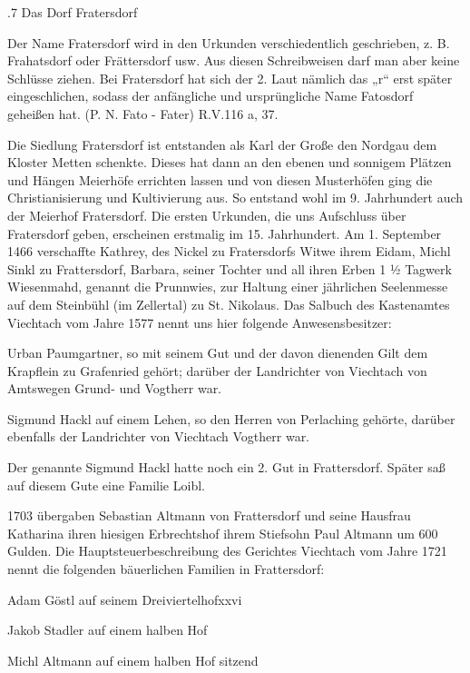 .7 Das Dorf Fratersdorf

Der Name Fratersdorf wird in den Urkunden verschiedentlich geschrieben, z. B.
Frahatsdorf oder Frättersdorf usw. Aus diesen Schreibweisen darf man aber keine
Schlüsse ziehen. Bei Fratersdorf hat sich der 2. Laut nämlich das „r“ erst
später eingeschlichen, sodass der anfängliche und ursprüngliche Name Fatosdorf
geheißen hat. (P. N. Fato - Fater) R.V.116 a, 37.

Die Siedlung Fratersdorf ist entstanden als Karl der Große den Nordgau dem
Kloster Metten schenkte. Dieses hat dann an den ebenen und sonnigem Plätzen und
Hängen Meierhöfe errichten lassen und von diesen Musterhöfen ging die
Christianisierung und Kultivierung aus. So entstand wohl im 9. Jahrhundert auch
der Meierhof Fratersdorf. Die ersten Urkunden, die uns Aufschluss über
Fratersdorf geben, erscheinen erstmalig im 15. Jahrhundert. Am 1. September 1466
verschaffte Kathrey, des Nickel zu Fratersdorfs Witwe ihrem Eidam, Michl Sinkl
zu Frattersdorf, Barbara, seiner Tochter und all ihren Erben 1 ½ Tagwerk
Wiesenmahd, genannt die Prunnwies, zur Haltung einer jährlichen Seelenmesse auf
dem Steinbühl (im Zellertal) zu St. Nikolaus. Das Salbuch des Kastenamtes
Viechtach vom Jahre 1577 nennt uns hier folgende Anwesensbesitzer:



Urban Paumgartner, so mit seinem Gut und der davon dienenden Gilt dem Krapflein
zu Grafenried gehört; darüber der Landrichter von Viechtach von Amtswegen Grund-
und Vogtherr war.

Sigmund Hackl auf einem Lehen, so den Herren von Perlaching gehörte, darüber
ebenfalls der Landrichter von Viechtach Vogtherr war.

Der genannte Sigmund Hackl hatte noch ein 2. Gut in Frattersdorf. Später saß auf
diesem Gute eine Familie Loibl.



1703 übergaben Sebastian Altmann von Frattersdorf und seine Hausfrau Katharina
ihren hiesigen Erbrechtshof ihrem Stiefsohn Paul Altmann um 600 Gulden. Die
Hauptsteuerbeschreibung des Gerichtes Viechtach vom Jahre 1721 nennt die
folgenden bäuerlichen Familien in Frattersdorf:



Adam Göstl auf seinem Dreiviertelhofxxvi

Jakob Stadler auf einem halben Hof

Michl Altmann auf einem halben Hof sitzend



